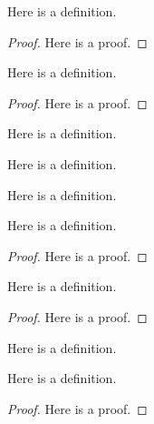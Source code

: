 \begin{lemma}\label{winner_take_max}
    \leanok
    Here is a definition.
\end{lemma}
\begin{proof}
    Here is a proof.
\end{proof}

\begin{lemma}\label{delete_i_nonempty}
    \leanok
    Here is a definition.
\end{lemma}
\begin{proof}
    Here is a proof.
\end{proof}

\begin{definition}\label{B}
    \leanok
    Here is a definition.
\end{definition}

\begin{definition}\label{secondprice}
    \leanok
    Here is a definition.
\end{definition}

\begin{definition}\label{utility}
    \leanok
    Here is a definition.
\end{definition}

\begin{lemma}\label{utility_winner}
    \leanok
    Here is a definition.
\end{lemma}
\begin{proof}
    Here is a proof.
\end{proof}

\begin{lemma}\label{utility_loser}
    \leanok
    Here is a definition.
\end{lemma}
\begin{proof}
    Here is a proof.
\end{proof}

\begin{definition}\label{dominant}
    \leanok
    Here is a definition.
\end{definition}


\begin{lemma}\label{gt_wins}
    \leanok
    Here is a definition.
\end{lemma}
\begin{proof}
    Here is a proof.
\end{proof}



